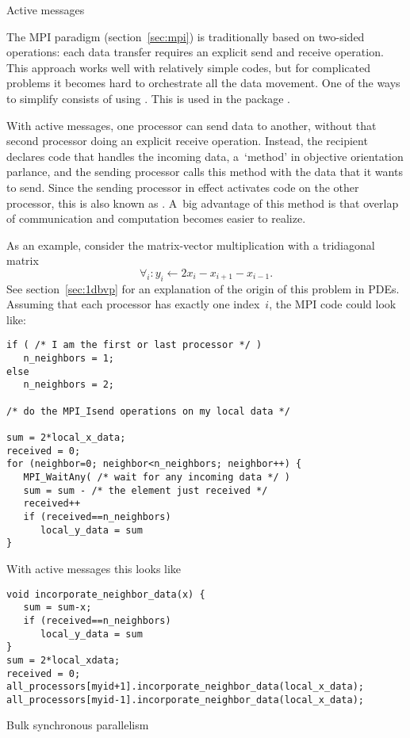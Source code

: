  {Active messages}
\label{sec:charm++}

The MPI paradigm (section~\ref{sec:mpi}) is traditionally based on
two-sided operations: each data transfer requires an explicit send and
receive operation. This approach works well with relatively simple
codes, but for complicated problems it becomes hard to orchestrate all
the data movement. One of the ways to simplify consists of using
. This is used in the package
\cite{charmpp}.

With active messages, one processor can send data to another, without
that second processor doing an explicit receive operation. Instead,
the recipient declares code that handles the incoming data, a~`method'
in objective orientation parlance, and the sending processor calls
this method with the data that it wants to send. Since the sending
processor in effect activates code on the other processor, this is
also known as . A~big advantage of
this method is that overlap of communication and computation becomes
easier to realize.

As an example, consider the matrix-vector multiplication with a
tridiagonal matrix
\[ \forall_i\colon y_i\leftarrow 2x_i-x_{i+1}-x_{i-1}. \]
See section~\ref{sec:1dbvp} for an explanation of the origin of this
problem in \acp{PDE}. Assuming that each processor has exactly one
index~$i$, the MPI code could look like:
\lstset{language=C}
\begin{lstlisting}
if ( /* I am the first or last processor */ )
   n_neighbors = 1;
else
   n_neighbors = 2;

/* do the MPI_Isend operations on my local data */

sum = 2*local_x_data;
received = 0;
for (neighbor=0; neighbor<n_neighbors; neighbor++) {
   MPI_WaitAny( /* wait for any incoming data */ )
   sum = sum - /* the element just received */
   received++
   if (received==n_neighbors)
      local_y_data = sum
}
\end{lstlisting}
With active messages this looks like
\lstset{language=C}
\begin{lstlisting}
void incorporate_neighbor_data(x) {
   sum = sum-x;
   if (received==n_neighbors)
      local_y_data = sum
}
sum = 2*local_xdata;
received = 0;
all_processors[myid+1].incorporate_neighbor_data(local_x_data);
all_processors[myid-1].incorporate_neighbor_data(local_x_data);
\end{lstlisting}

 {Bulk synchronous parallelism}
\label{sec:bsp}

